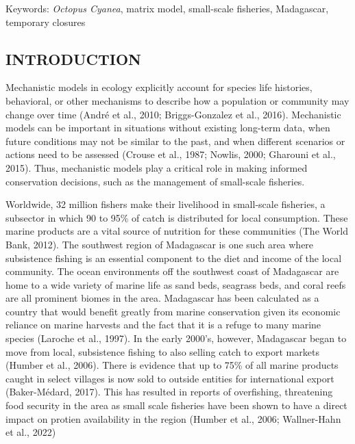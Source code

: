 \documentclass[
  12pt,
]{article}
\begin{document}
Keywords: \emph{Octopus Cyanea}, matrix model, small-scale fisheries, Madagascar, temporary closures

\hypertarget{introduction-1}{%
\subsection{INTRODUCTION}\label{introduction-1}}

Mechanistic models in ecology explicitly account for species life histories, behavioral, or other mechanisms to describe how a population or community may change over time (André et al., 2010; Briggs-Gonzalez et al., 2016). Mechanistic models can be important in situations without existing long-term data, when future conditions may not be similar to the past, and when different scenarios or actions need to be assessed (Crouse et al., 1987; Nowlis, 2000; Gharouni et al., 2015). Thus, mechanistic models play a critical role in making informed conservation decisions, such as the management of small-scale fisheries.

Worldwide, 32 million fishers make their livelihood in small-scale fisheries, a subsector in which 90 to 95\% of catch is distributed for local consumption. These marine products are a vital source of nutrition for these communities (The World Bank, 2012). The southwest region of Madagascar is one such area where subsistence fishing is an essential component to the diet and income of the local community. The ocean environments off the southwest coast of Madagascar are home to a wide variety of marine life as sand beds, seagrass beds, and coral reefs are all prominent biomes in the area. Madagascar has been calculated as a country that would benefit greatly from marine conservation given its economic reliance on marine harvests and the fact that it is a refuge to many marine species (Laroche et al., 1997). In the early 2000's, however, Madagascar began to move from local, subsistence fishing to also selling catch to export markets (Humber et al., 2006). There is evidence that up to 75\% of all marine products caught in select villages is now sold to outside entities for international export (Baker-Médard, 2017). This has resulted in reports of overfishing, threatening food security in the area as small scale fisheries have been shown to have a direct impact on protien availability in the region (Humber et al., 2006; Wallner-Hahn et al., 2022)
\end{document}
